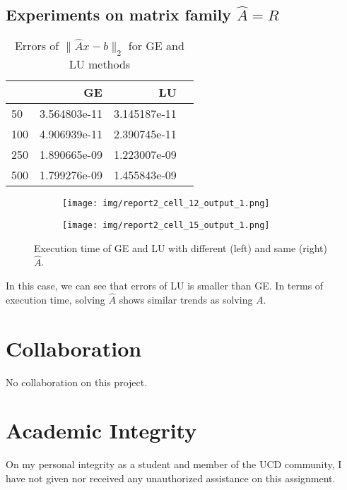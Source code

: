 \documentclass[a4paper,12pt]{article}
\begin{document}
\subsection{Experiments on matrix family $\hat{A} = R$}

\begin{table}[H]
\begin{center}	
	\begin{tabular}{lrrr}
	\toprule
	{} &             GE &            LU \\
	\midrule
	 50 &  3.564803e-11 &  3.145187e-11 \\
	100 &  4.906939e-11 &  2.390745e-11 \\
	250 &  1.890665e-09 &  1.223007e-09 \\
	500 &  1.799276e-09 &  1.455843e-09 \\
	\bottomrule
	\end{tabular}
	\caption{Errors of $\| \hat{A}x - b\|_{2}$ for GE and LU methods}
\end{center}
\end{table}

\begin{figure}[H]
    \centering
	\begin{subfigure}[b]{0.49\textwidth}
	    \centering
	    \texttt{[image: img/report2\_cell\_12\_output\_1.png]}
	    \label{fig:2}
	\end{subfigure}
	\hfill
	\begin{subfigure}[b]{0.49\textwidth}
	    \centering
	     \texttt{[image: img/report2\_cell\_15\_output\_1.png]}
	     \label{fig:3}
	\end{subfigure}
	\caption{Execution time of GE and LU with different (left) and same (right) $\hat{A}$.}
\end{figure}

In this case, we can see that errors of LU is smaller than GE.
In terms of execution time,
solving $\hat{A}$ shows similar trends as solving $A$.

\section{Collaboration}
No collaboration on this project.


\section{Academic Integrity}
On my personal integrity as a student and member of the UCD community, I have not given nor received any unauthorized assistance on this assignment.
\end{document}
